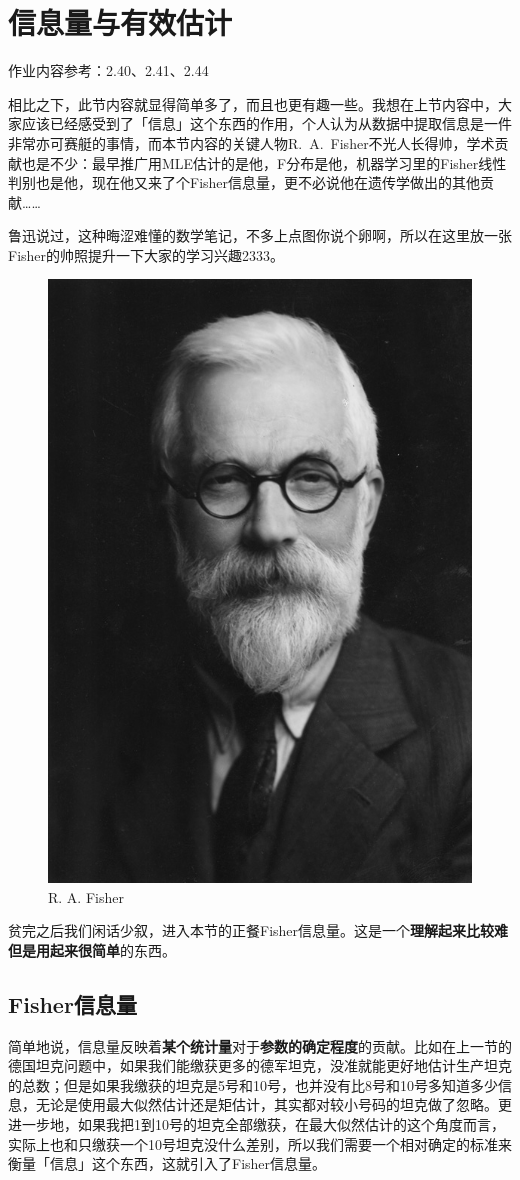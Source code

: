 \documentclass[10pt, a4paper]{article}
\begin{document}
\section{信息量与有效估计}
作业内容参考：2.40、2.41、2.44\par
相比之下，此节内容就显得简单多了，而且也更有趣一些。我想在上节内容中，大家应该已经感受到了「信息」这个东西的作用，个人认为从数据中提取信息是一件非常亦可赛艇的事情，而本节内容的关键人物R.~A.~Fisher不光人长得帅，学术贡献也是不少：最早推广用MLE估计的是他，F分布是他，机器学习里的Fisher线性判别也是他，现在他又来了个Fisher信息量，更不必说他在遗传学做出的其他贡献……\par
鲁迅说过，这种晦涩难懂的数学笔记，不多上点图你说个卵啊，所以在这里放一张Fisher的帅照提升一下大家的学习兴趣2333。
\begin{figure}[H]
    \centering
    \includegraphics[width=0.5\linewidth]{R.A.Fisher.jpg}
    \caption{R. A. Fisher}
    \label{fig:Fisher}
\end{figure}
贫完之后我们闲话少叙，进入本节的正餐Fisher信息量。这是一个\textbf{理解起来比较难但是用起来很简单}的东西。
\subsection{Fisher信息量}
简单地说，信息量反映着\textbf{某个统计量}对于\textbf{参数的确定程度}的贡献。比如在上一节的德国坦克问题中，如果我们能缴获更多的德军坦克，没准就能更好地估计生产坦克的总数；但是如果我缴获的坦克是5号和10号，也并没有比8号和10号多知道多少信息，无论是使用最大似然估计还是矩估计，其实都对较小号码的坦克做了忽略。更进一步地，如果我把1到10号的坦克全部缴获，在最大似然估计的这个角度而言，实际上也和只缴获一个10号坦克没什么差别，所以我们需要一个相对确定的标准来衡量「信息」这个东西，这就引入了Fisher信息量。\par
\end{document}
